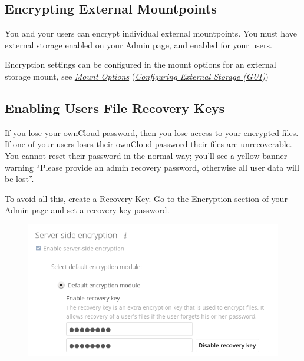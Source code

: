 \documentclass[letterpaper,10pt,english]{sphinxmanual}
\begin{document}
\subsection{Encrypting External Mountpoints}
\label{configuration_files/encryption_configuration:encrypting-external-mountpoints}
You and your users can encrypt individual external mountpoints. You must have
external storage enabled on your Admin page, and enabled for your users.

Encryption settings can be configured in the mount options for an external
storage mount, see {\hyperref[configuration_files/external_storage_configuration_gui:external-storage-mount-options-label]{\emph{Mount Options}}}
({\hyperref[configuration_files/external_storage_configuration_gui::doc]{\emph{Configuring External Storage (GUI)}}})


\subsection{Enabling Users File Recovery Keys}
\label{configuration_files/encryption_configuration:enabling-users-file-recovery-keys}
If you lose your ownCloud password, then you lose access to your encrypted
files. If one of your users loses their ownCloud password their files are
unrecoverable. You cannot reset their password in the normal way; you'll see a
yellow banner warning ``Please provide an admin recovery password, otherwise all
user data will be lost''.

To avoid all this, create a Recovery Key. Go to the Encryption section of your
Admin page and set a recovery key password.
\begin{figure}[htbp]
\centering

\includegraphics{encryption10.png}
\end{figure}
\end{document}
